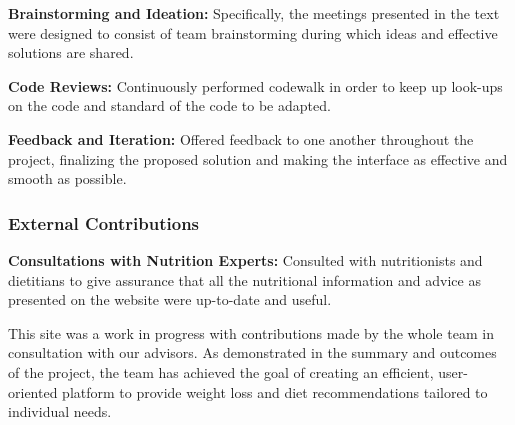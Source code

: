 \documentclass[a4paper,12pt]{article}
\begin{document}
\noindent\textbf{Brainstorming and Ideation:} Specifically, the meetings presented in the text were designed to consist of team brainstorming during which ideas and effective solutions are shared.

\noindent\textbf{Code Reviews:} Continuously performed codewalk in order to keep up look-ups on the code and standard of the code to be adapted.

\noindent\textbf{Feedback and Iteration:} Offered feedback to one another throughout the project, finalizing the proposed solution and making the interface as effective and smooth as possible.


\subsubsection{External Contributions}
\textbf{Consultations with Nutrition Experts:} Consulted with nutritionists and dietitians to give assurance that all the nutritional information and advice as presented on the website were up-to-date and useful.

\vspace{12cm}

This site was a work in progress with contributions made by the whole team in consultation with our advisors. As demonstrated in the summary and outcomes of the project, the team has achieved the goal of creating an efficient, user-oriented platform to provide weight loss and diet recommendations tailored to individual needs.

\clearpage

\printbibliography
\end{document}
